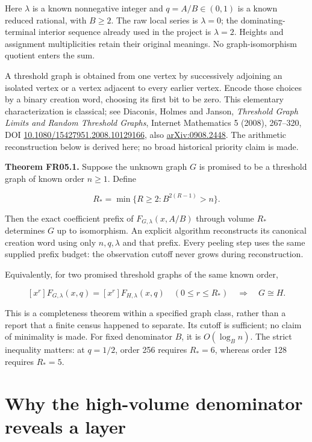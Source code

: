 \documentclass[
  11pt,
  a4paper,
]{report}
\begin{document}
Here \(\lambda\) is a known nonnegative integer and \(q=A/B\in(0,1)\) is
a known reduced rational, with \(B\ge2\). The raw local series is
\(\lambda=0\); the dominating-terminal interior sequence already used in
the project is \(\lambda=2\). Heights and assignment multiplicities
retain their original meanings. No graph-isomorphism quotient enters the
sum.

A threshold graph is obtained from one vertex by successively adjoining
an isolated vertex or a vertex adjacent to every earlier vertex. Encode
those choices by a binary creation word, choosing its first bit to be
zero. This elementary characterization is classical; see Diaconis,
Holmes and Janson, \emph{Threshold Graph Limits and Random Threshold
Graphs}, Internet Mathematics 5 (2008), 267--320, DOI
\href{https://doi.org/10.1080/15427951.2008.10129166}{10.1080/15427951.2008.10129166},
also \href{https://arxiv.org/abs/0908.2448}{arXiv:0908.2448}. The
arithmetic reconstruction below is derived here; no broad historical
priority claim is made.

\textbf{Theorem FR05.1.} Suppose the unknown graph \(G\) is promised to
be a threshold graph of known order \(n\ge1\). Define

\[
 R_* = \min\{R\ge2:B^{2(R-1)}>n\}.
\]

Then the exact coefficient prefix of \(F_{G,\lambda}(x,A/B)\) through
volume \(R_*\) determines \(G\) up to isomorphism. An explicit algorithm
reconstructs its canonical creation word using only \(n,q,\lambda\) and
that prefix. Every peeling step uses the same supplied prefix budget:
the observation cutoff never grows during reconstruction.

Equivalently, for two promised threshold graphs of the same known order,

\[
 [x^r]F_{G,\lambda}(x,q)=[x^r]F_{H,\lambda}(x,q)
 \quad(0\le r\le R_*)
 \quad\Longrightarrow\quad G\cong H.
\]

This is a completeness theorem within a specified graph class, rather
than a report that a finite census happened to separate. Its cutoff is
sufficient; no claim of minimality is made. For fixed denominator \(B\),
it is \(O(\log_B n)\). The strict inequality matters: at \(q=1/2\),
order 256 requires \(R_*=6\), whereas order 128 requires \(R_*=5\).

\hypertarget{why-the-high-volume-denominator-reveals-a-layer}{%
\section{Why the high-volume denominator reveals a
layer}\label{why-the-high-volume-denominator-reveals-a-layer}}
\end{document}

